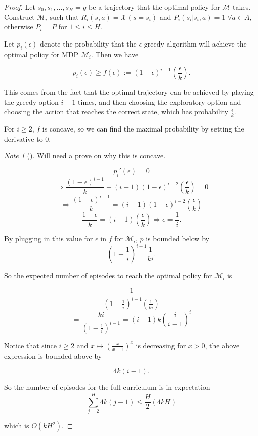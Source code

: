\documentclass[12pt, letterpaper]{article}
\theoremstyle{definition}
\theoremstyle{remark}
\newtheorem*{note}{Note}
\begin{document}
\begin{proof}[Proof]
    Let \(s_0, s_1, \ldots, s_H = g\) be a trajectory that the optimal policy for \(\mathcal{M}\) takes.
    Construct \(\mathcal{M}_i\) such that \(R_i(s, a) = \mathcal{X}(s = s_i)\) and \(P_i(s_i | s_i, a) = 1 \; \forall a \in A\), otherwise \(P_i = P\) for \(1 \leq i \leq H\).

    Let \(p_i(\epsilon)\) denote the probability that the \(\epsilon\)-greedy algorithm will achieve the optimal policy for MDP \(\mathcal{M}_i\). Then we have 

    \[p_i(\epsilon) \geq f(\epsilon) := (1-\epsilon)^{i-1}(\frac{\epsilon}{k}).\]

    This comes from the fact that the optimal trajectory can be achieved by playing the greedy option \(i-1\) times, and then choosing the exploratory option and choosing the action that reaches the correct state, which has probability \(\frac{\epsilon}{k}\).

    For \(i \geq 2\), \(f\) is concave, so we can find the maximal probability by setting the derivative to 0.

    \begin{note}[]
        \color{red}
        Will need a prove on why this is concave.
    \end{note}

    \[p_i'(\epsilon) = 0\]
    \[\Rightarrow \frac{(1 - \epsilon)^{i-1}}{k} - (i-1)(1-\epsilon)^{i-2}(\frac{\epsilon}{k}) = 0\]
    \[\Rightarrow \frac{(1-\epsilon)^{i-1}}{k} = (i-1)(1-\epsilon)^{i-2}(\frac{\epsilon}{k})\]
    \[\frac{1-\epsilon}{k} = (i-1)(\frac{\epsilon}{k}) \Rightarrow \epsilon = \frac{1}{i}.\]

    By plugging in this value for \(\epsilon\) in \(f\) for \(\mathcal{M}_i\), \(p\) is bounded below by
    \[(1 - \frac{1}{i})^{i-1}\frac{1}{ki}.\]

    So the expected number of episodes to reach the optimal policy for \(\mathcal{M}_i\) is

    \[\frac{1}{(1-\frac{1}{i})^{i-1}(\frac{1}{ki})}\]
    \[= \frac{ki}{(1-\frac{1}{i})^{i-1}} = (i-1)k(\frac{i}{i-1})^i\]

    Notice that since \(i \geq 2\) and \(x \mapsto (\frac{x}{x-1})^x\) is decreasing for \(x > 0\), the above expression is bounded above by

    \[4k(i-1).\]

    So the number of episodes for the full curriculum is in expectation
    \[\sum_{j=2}^{H} 4k(j-1) \leq \frac{H}{2}(4kH)\]

    which is \(O(kH^2)\).
\end{proof}
\end{document}
